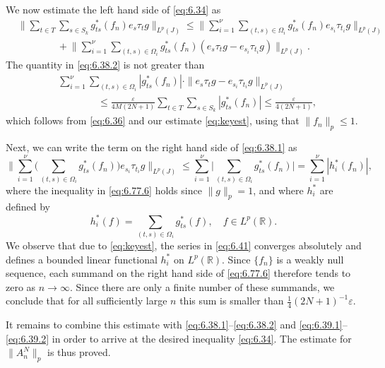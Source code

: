 \documentclass[reqno,a4paper,12pt]{amsart}
\numberwithin{equation}{section}
\numberwithin{figure}{section}
\newcommand\R{\mathbb{R}}
\newcommand\1{\mathds{1}}
\newcommand\eps{\varepsilon}
\newcommand{\TTT}{T}
\newcommand{\SSS}{S}
\newcommand{\ts}{\tau}
\renewcommand\le{\leqslant}
\theoremstyle{plain}
\theoremstyle{definition}
\begin{document}
We now estimate the left hand side of \eqref{eq:6.34} as 
\begin{align}
& \Big\| \sum_{t\in\TTT} \sum_{s\in \SSS_k} 
 g_{ts}^*(f_n) e_s \ts_t g \Big\|_{L^p(J)}
\le \Big\| \sum_{i=1}^{\nu} \sum_{(t,s) \in \Omega_i}
 g_{ts}^*(f_n) e_{s_i} \ts_{t_i} g \Big\|_{L^p(J)} \label{eq:6.38.1} \\
& \qquad \qquad + \Big\|   \sum_{i=1}^{\nu} \sum_{(t,s) \in \Omega_i}
 g_{ts}^*(f_n) ( e_s \ts_t g -e_{s_i} \ts_{t_i} g) \Big\|_{L^p(J)}. \label{eq:6.38.2}
\end{align}
The quantity in \eqref{eq:6.38.2} is not greater than
\begin{align}
&  \sum_{i=1}^{\nu} \sum_{(t,s) \in \Omega_i}
 |g_{ts}^*(f_n)|\cdot\|e_s \ts_t g-e_{s_i} \ts_{t_i} g\|_{L^p(J)} \label{eq:6.39.1} \\
& \qquad  \qquad  
\le \frac{\eps}{4M(2N+1) } \sum_{t\in\TTT} \sum_{s\in\SSS_k}
 |g_{ts}^*(f_n)|\le \frac{\eps}{4(2N+1)}, \label{eq:6.39.2}
\end{align}
which follows from \eqref{eq:6.36} and our estimate \eqref{eq:keyest},
 using that $\|f_n\|_p \le 1$.

Next, we can write the term on the right hand side of \eqref{eq:6.38.1} as
\begin{equation}
\label{eq:6.77.6}
 \Big\| \sum_{i=1}^{\nu} \Big( \sum_{(t,s) \in \Omega_i}
 g_{ts}^*(f_n) \Big) e_{s_i} \ts_{t_i} g \Big\|_{L^p(J)}
 \le  \sum_{i=1}^{\nu} \Big| \sum_{(t,s) \in \Omega_i}
 g_{ts}^*(f_n)  \Big| = 
   \sum_{i=1}^{\nu} | h_{i}^*(f_n) |,
\end{equation}
where the inequality in \eqref{eq:6.77.6} holds
since $\|g\|_p = 1$, and where $h_i^*$ are defined by
\begin{equation}
\label{eq:6.41}
h_i^*(f) = \sum_{(t,s) \in \Omega_i}
 g_{ts}^*(f), \quad f \in L^p(\R).
\end{equation}
We observe that due to \eqref{eq:keyest}, the series in \eqref{eq:6.41}
converges absolutely and defines a
bounded linear functional $h_i^*$ on $L^p(\R)$. 
Since $\{f_n\}$ is a weakly null sequence, each summand
on the right hand side of   \eqref{eq:6.77.6} therefore
tends to zero as $n \to \infty$.
Since there are only  a finite number of these summands,
we conclude that
for all sufficiently large $n$ this sum is smaller than 
$\tfrac1{4} (2N+1)^{-1} \eps$. 

It remains to combine this estimate with
\eqref{eq:6.38.1}--\eqref{eq:6.38.2} and
 \eqref{eq:6.39.1}--\eqref{eq:6.39.2}
 in order to arrive at the desired inequality \eqref{eq:6.34}.
 The   estimate for $\| A^N_n \|_p$ is thus proved.
\end{document}
